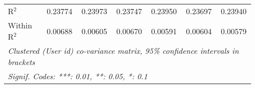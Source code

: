 \begin{table}[htbp]
\begin{threeparttable}[b]
\begin{tabular}{lcccccc}
         R$^2$                            & 0.23774          & 0.23973          & 0.23747          & 0.23950          & 0.23697          & 0.23940\\  
         Within R$^2$                     & 0.00688          & 0.00605          & 0.00670          & 0.00591          & 0.00604          & 0.00579\\  
         \midrule \midrule
         \multicolumn{7}{l}{\emph{Clustered (User id) co-variance matrix, 95\% confidence intervals in brackets}}\\
         \multicolumn{7}{l}{\emph{Signif. Codes: ***: 0.01, **: 0.05, *: 0.1}}\\
      \end{tabular}
   \end{threeparttable}
\end{table}


